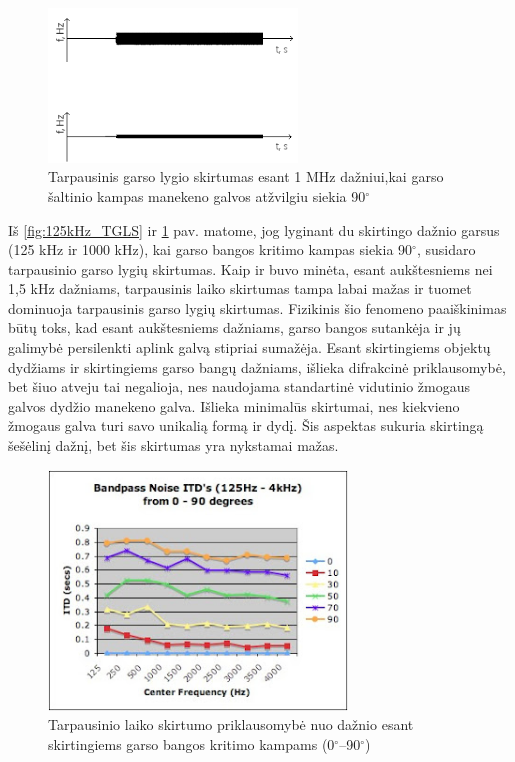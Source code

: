 \documentclass[]{vgtuef}
\begin{document}
\begin{figure}[!h]
  \centering
  \includegraphics[width=250px]{img/1000kHz_TGLS.png}
  \caption{Tarpausinis garso lygio skirtumas esant 1 MHz dažniui,\newline kai garso šaltinio kampas manekeno galvos atžvilgiu siekia 90$^\circ$}
  \label{fig:1000kHz_TGLS}
\end{figure}

Iš \ref{fig:125kHz_TGLS} ir \ref{fig:1000kHz_TGLS} pav. matome, jog lyginant du skirtingo dažnio garsus (125 kHz ir 1000 kHz), kai garso bangos kritimo kampas siekia 90$^\circ$, susidaro tarpausinio garso lygių skirtumas. Kaip ir buvo minėta, esant aukštesniems nei 1,5 kHz dažniams, tarpausinis laiko skirtumas tampa labai mažas ir tuomet dominuoja tarpausinis garso lygių skirtumas. Fizikinis šio fenomeno paaiškinimas būtų toks, kad esant aukštesniems dažniams, garso bangos sutankėja ir jų galimybė persilenkti aplink galvą stipriai sumažėja. Esant skirtingiems objektų dydžiams ir skirtingiems garso bangų dažniams, išlieka difrakcinė priklausomybė, bet šiuo atveju tai negalioja, nes naudojama standartinė vidutinio žmogaus galvos dydžio manekeno galva. Išlieka minimalūs skirtumai, nes kiekvieno žmogaus galva turi savo unikalią formą ir dydį. Šis aspektas sukuria skirtingą šešėlinį dažnį, bet šis skirtumas yra nykstamai mažas.

\begin{figure}[!h]
  \centering
  \includegraphics[width=300px]{img/ITD_freq.png}
  \caption{Tarpausinio laiko skirtumo priklausomybė nuo dažnio esant skirtingiems garso bangos kritimo kampams (0$^\circ$--90$^\circ$)}
  \label{fig:ITD_freq}
\end{figure}
\end{document}
